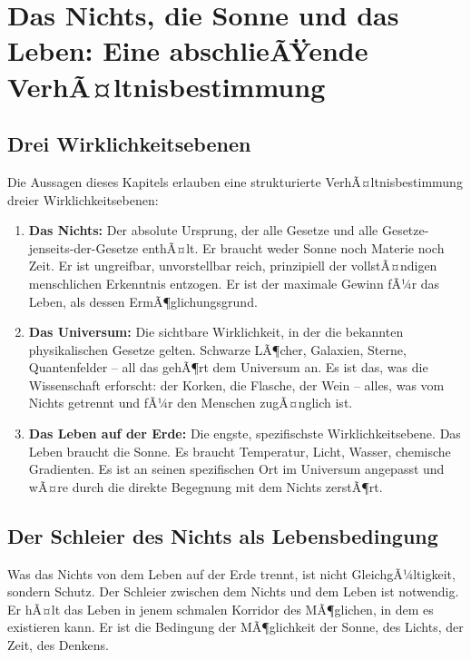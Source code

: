 ﻿\documentclass[12pt,a4paper]{report}
\begin{document}
\section{Das Nichts, die Sonne und das Leben: Eine abschlieÃŸende VerhÃ¤ltnisbestimmung}

\subsection{Drei Wirklichkeitsebenen}

Die Aussagen dieses Kapitels erlauben eine strukturierte VerhÃ¤ltnisbestimmung dreier Wirklichkeitsebenen:

\begin{enumerate}
	\item \textbf{Das Nichts:} Der absolute Ursprung, der alle Gesetze und alle Gesetze-jenseits-der-Gesetze enthÃ¤lt. Er braucht weder Sonne noch Materie noch Zeit. Er ist ungreifbar, unvorstellbar reich, prinzipiell der vollstÃ¤ndigen menschlichen Erkenntnis entzogen. Er ist der maximale Gewinn fÃ¼r das Leben, als dessen ErmÃ¶glichungsgrund.

	\item \textbf{Das Universum:} Die sichtbare Wirklichkeit, in der die bekannten physikalischen Gesetze gelten. Schwarze LÃ¶cher, Galaxien, Sterne, Quantenfelder -- all das gehÃ¶rt dem Universum an. Es ist das, was die Wissenschaft erforscht: der Korken, die Flasche, der Wein -- alles, was vom Nichts getrennt und fÃ¼r den Menschen zugÃ¤nglich ist.

	\item \textbf{Das Leben auf der Erde:} Die engste, spezifischste Wirklichkeitsebene. Das Leben braucht die Sonne. Es braucht Temperatur, Licht, Wasser, chemische Gradienten. Es ist an seinen spezifischen Ort im Universum angepasst und wÃ¤re durch die direkte Begegnung mit dem Nichts zerstÃ¶rt.
\end{enumerate}

\subsection{Der Schleier des Nichts als Lebensbedingung}

Was das Nichts von dem Leben auf der Erde trennt, ist nicht GleichgÃ¼ltigkeit, sondern Schutz. Der Schleier zwischen dem Nichts und dem Leben ist notwendig. Er hÃ¤lt das Leben in jenem schmalen Korridor des MÃ¶glichen, in dem es existieren kann. Er ist die Bedingung der MÃ¶glichkeit der Sonne, des Lichts, der Zeit, des Denkens.
\end{document}
